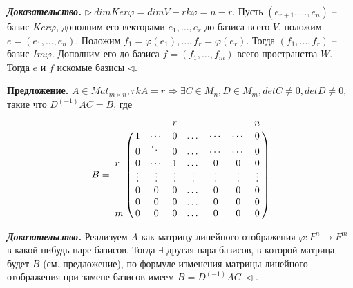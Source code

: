 \vspace{\baselineskip}
\textbf{\textit{Доказательство.}} $\rhd \ dimKer \varphi = dim V - rk \varphi = n - r$. Пусть $(e_{r+1}, \dots, e_n)$ -- базис $Ker \varphi$, дополним его векторами $e_1, \dots, e_r$  до базиса всего $V$, положим $e = (e_1, \dots, e_n)$. Положим $f_1 = \varphi(e_1), \dots, f_r = \varphi(e_r)$. Тогда $(f_1, \dots, f_r)$ -- базис $Im \varphi$. Дополним его до базиса $f = (f_1, \dots, f_m)$ всего пространства $W$. Тогда $e$ и $f$ искомые базисы $\lhd$.

\vspace{\baselineskip}
\textbf{Предложение.} $A \in Mat_{m \times n}, rkA = r \Rightarrow \exists C \in M_n, D \in M_m, detC \neq 0, detD \neq 0$, такие что $D^{(-1)} A C = B$, где 
\[ B = \bordermatrix{ 
    	 & & & r & & & & n \cr
    	 & 1 & \cdots & 0 & \dots & \cdots & \cdots & 0 \cr 
         & 0 & \ddots & 0 & \dots & \cdots & \cdots & 0 \cr
		r & 0 & \cdots & 1 & \dots & 0 & 0 & 0  \cr
         & \vdots & \vdots & \vdots & \vdots & \vdots & \vdots & \vdots \cr
        & 0 & 0 & 0 & \dots & 0 & 0 & 0  \cr
        & 0 & 0 & 0 & \dots & 0 & 0 & 0  \cr
       m & 0 & 0 & 0 & \dots  & 0 & 0 & 0 }
\]

\vspace{\baselineskip}
\textbf{\textit{Доказательство.}} Реализуем $A$ как матрицу линейного отображения $\varphi : F^n \rightarrow F^m$ в какой-нибудь паре базисов. Тогда $\exists$ другая пара базисов, в которой матрица будет $B$ (см. предложение), по формуле изменения матрицы линейного отображения при замене базисов имеем $B = D^{(-1)} A C \ \lhd$.

